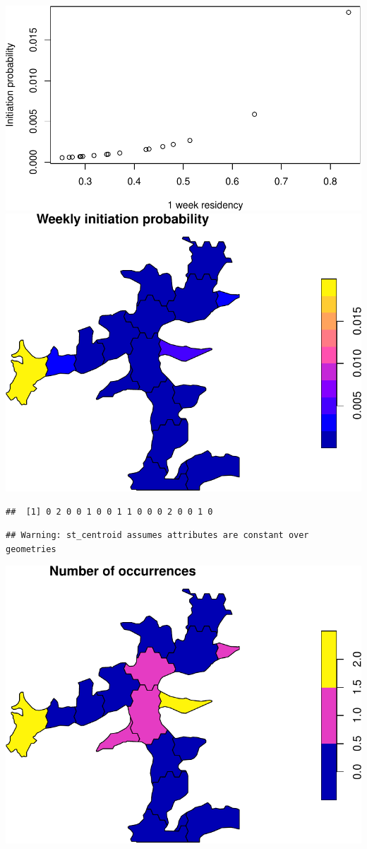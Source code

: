 \documentclass[
]{article}
\begin{document}
\includegraphics{habmodel_files/figure-latex/unnamed-chunk-5-1.pdf}
\includegraphics{habmodel_files/figure-latex/unnamed-chunk-5-2.pdf}

\begin{verbatim}
##  [1] 0 2 0 0 1 0 0 1 1 0 0 0 2 0 0 1 0
\end{verbatim}

\begin{verbatim}
## Warning: st_centroid assumes attributes are constant over geometries
\end{verbatim}

\includegraphics{habmodel_files/figure-latex/unnamed-chunk-6-1.pdf}
\end{document}
